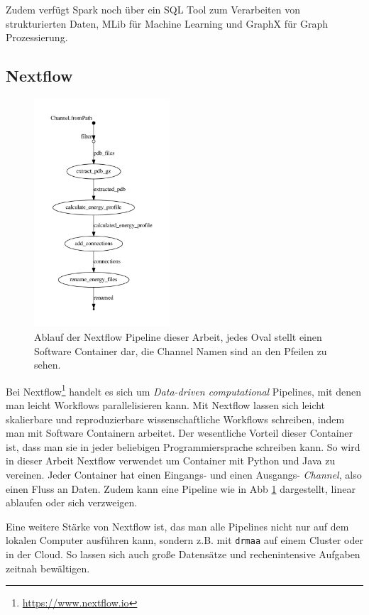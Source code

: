 Zudem verfügt Spark noch über ein SQL Tool zum Verarbeiten von strukturierten Daten, MLib für Machine Learning und GraphX für Graph Prozessierung.



\subsection{Nextflow}

\begin{figure}
\centering
\includegraphics[width=0.45\textwidth]{images/flowchart.pdf}
\caption{Ablauf der Nextflow Pipeline dieser Arbeit, jedes Oval stellt einen Software Container dar, die Channel Namen sind an den Pfeilen zu sehen.}
\label{fig:nextflow_pipe}
\end{figure}
Bei Nextflow\footnote{\url{https://www.nextflow.io}} handelt es sich um \emph{Data-driven computational} Pipelines, mit denen man leicht Workflows parallelisieren kann. Mit Nextflow lassen sich leicht skalierbare und reproduzierbare wissenschaftliche Workflows schreiben, indem man mit Software Containern arbeitet. Der wesentliche Vorteil dieser Container ist, dass man sie in jeder beliebigen Programmiersprache schreiben kann. So wird in dieser Arbeit Nextflow verwendet um Container mit Python und Java zu vereinen. Jeder Container hat einen Eingangs- und einen Ausgangs- \emph{Channel}, also einen Fluss an Daten. Zudem kann eine Pipeline wie in \ac{Abb} \ref{fig:nextflow_pipe} dargestellt, linear ablaufen oder sich verzweigen.

Eine weitere Stärke von Nextflow ist, das man alle Pipelines nicht nur auf dem lokalen Computer ausführen kann, sondern z.B. mit \texttt{drmaa} auf einem Cluster oder in der Cloud. So lassen sich auch große Datensätze und rechenintensive Aufgaben zeitnah bewältigen.


